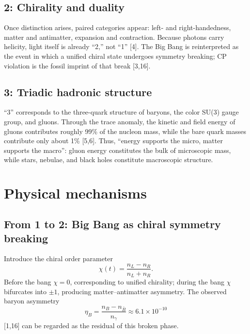 \documentclass[11pt,a4paper]{article}
\begin{document}
\subsection{2: Chirality and duality}
Once distinction arises, paired categories appear: left- and right-handedness, matter and antimatter, expansion and contraction. Because photons carry helicity, light itself is already ``2,'' not ``1'' [4]. The Big Bang is reinterpreted as the event in which a unified chiral state undergoes symmetry breaking; CP violation is the fossil imprint of that break [3,16].

\subsection{3: Triadic hadronic structure}
``3'' corresponds to the three-quark structure of baryons, the color SU(3) gauge group, and gluons. Through the trace anomaly, the kinetic and field energy of gluons contributes roughly 99\% of the nucleon mass, while the bare quark masses contribute only about 1\% [5,6]. Thus, ``energy supports the micro, matter supports the macro'': gluon energy constitutes the bulk of microscopic mass, while stars, nebulae, and black holes constitute macroscopic structure.

\section{Physical mechanisms}

\subsection{From 1 to 2: Big Bang as chiral symmetry breaking}
Introduce the chiral order parameter
\begin{equation}
\chi(t)=\frac{n_L-n_R}{n_L+n_R}.
\end{equation}
Before the bang $\chi=0$, corresponding to unified chirality; during the bang $\chi$ bifurcates into $\pm1$, producing matter--antimatter asymmetry. The observed baryon asymmetry
\begin{equation}
\eta_B=\frac{n_B-n_{\bar B}}{n_\gamma}\approx 6.1\times10^{-10}
\end{equation}
[1,16] can be regarded as the residual of this broken phase.
\end{document}
